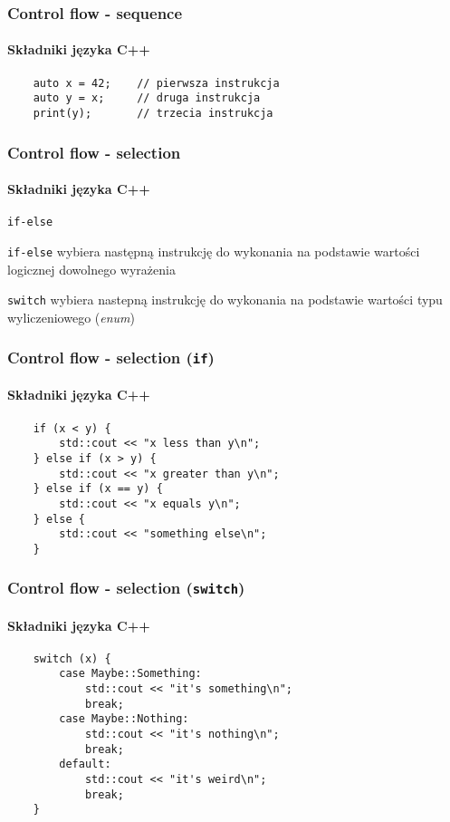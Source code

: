 \documentclass[aspectratio=169]{beamer}
\begin{document}
\begin{frame}[fragile]
    \frametitle{Control flow - sequence}
    \framesubtitle{Składniki języka C++}

    \begin{lstlisting}
    auto x = 42;    // pierwsza instrukcja
    auto y = x;     // druga instrukcja
    print(y);       // trzecia instrukcja
    \end{lstlisting}
\end{frame}

\begin{frame}
    \frametitle{Control flow - selection}
    \framesubtitle{Składniki języka C++}

    \begin{labeling}{{\tt if-else}}
        \item[{\tt if-else}] wybiera następną instrukcję do wykonania na
            podstawie wartości logicznej dowolnego wyrażenia
        \item[{\tt switch}] wybiera nastepną instrukcję do wykonania na
            podstawie wartości typu wyliczeniowego (\emph{enum})
    \end{labeling}
\end{frame}

\begin{frame}[fragile]
    \frametitle{Control flow - selection ({\tt if})}
    \framesubtitle{Składniki języka C++}

    \begin{lstlisting}
    if (x < y) {
        std::cout << "x less than y\n";
    } else if (x > y) {
        std::cout << "x greater than y\n";
    } else if (x == y) {
        std::cout << "x equals y\n";
    } else {
        std::cout << "something else\n";
    }
    \end{lstlisting}
\end{frame}

\begin{frame}[fragile]
    \frametitle{Control flow - selection ({\tt switch})}
    \framesubtitle{Składniki języka C++}

    \begin{lstlisting}
    switch (x) {
        case Maybe::Something:
            std::cout << "it's something\n";
            break;
        case Maybe::Nothing:
            std::cout << "it's nothing\n";
            break;
        default:
            std::cout << "it's weird\n";
            break;
    }
    \end{lstlisting}
\end{frame}
\end{document}
